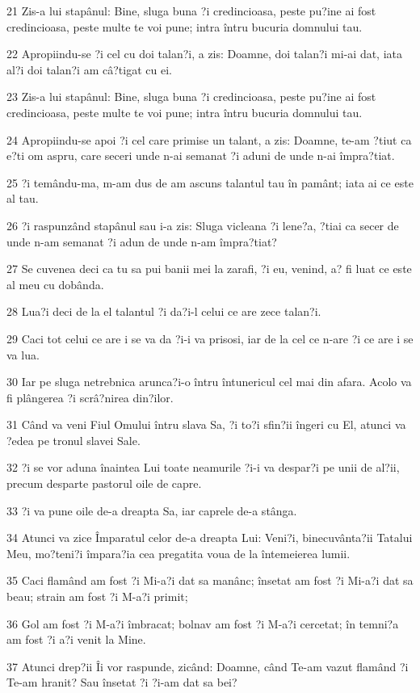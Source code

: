 \par 21 Zis-a lui stapânul: Bine, sluga buna ?i credincioasa, peste pu?ine ai fost credincioasa, peste multe te voi pune; intra întru bucuria domnului tau.
\par 22 Apropiindu-se ?i cel cu doi talan?i, a zis: Doamne, doi talan?i mi-ai dat, iata al?i doi talan?i am câ?tigat cu ei.
\par 23 Zis-a lui stapânul: Bine, sluga buna ?i credincioasa, peste pu?ine ai fost credincioasa, peste multe te voi pune; intra întru bucuria domnului tau.
\par 24 Apropiindu-se apoi ?i cel care primise un talant, a zis: Doamne, te-am ?tiut ca e?ti om aspru, care seceri unde n-ai semanat ?i aduni de unde n-ai împra?tiat.
\par 25 ?i temându-ma, m-am dus de am ascuns talantul tau în pamânt; iata ai ce este al tau.
\par 26 ?i raspunzând stapânul sau i-a zis: Sluga vicleana ?i lene?a, ?tiai ca secer de unde n-am semanat ?i adun de unde n-am împra?tiat?
\par 27 Se cuvenea deci ca tu sa pui banii mei la zarafi, ?i eu, venind, a? fi luat ce este al meu cu dobânda.
\par 28 Lua?i deci de la el talantul ?i da?i-l celui ce are zece talan?i.
\par 29 Caci tot celui ce are i se va da ?i-i va prisosi, iar de la cel ce n-are ?i ce are i se va lua.
\par 30 Iar pe sluga netrebnica arunca?i-o întru întunericul cel mai din afara. Acolo va fi plângerea ?i scrâ?nirea din?ilor.
\par 31 Când va veni Fiul Omului întru slava Sa, ?i to?i sfin?ii îngeri cu El, atunci va ?edea pe tronul slavei Sale.
\par 32 ?i se vor aduna înaintea Lui toate neamurile ?i-i va despar?i pe unii de al?ii, precum desparte pastorul oile de capre.
\par 33 ?i va pune oile de-a dreapta Sa, iar caprele de-a stânga.
\par 34 Atunci va zice Împaratul celor de-a dreapta Lui: Veni?i, binecuvânta?ii Tatalui Meu, mo?teni?i împara?ia cea pregatita voua de la întemeierea lumii.
\par 35 Caci flamând am fost ?i Mi-a?i dat sa manânc; însetat am fost ?i Mi-a?i dat sa beau; strain am fost ?i M-a?i primit;
\par 36 Gol am fost ?i M-a?i îmbracat; bolnav am fost ?i M-a?i cercetat; în temni?a am fost ?i a?i venit la Mine.
\par 37 Atunci drep?ii Îi vor raspunde, zicând: Doamne, când Te-am vazut flamând ?i Te-am hranit? Sau însetat ?i ?i-am dat sa bei?
